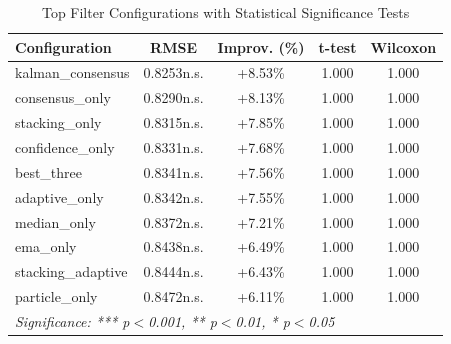 \begin{table}[htbp]
\centering
\caption{Top Filter Configurations with Statistical Significance Tests}
\label{tab:statistical-significance}
\begin{tabular}{l|c|c|c|c}
\hline
\textbf{Configuration} & \textbf{RMSE} & \textbf{Improv. (\%)} & \textbf{t-test} & \textbf{Wilcoxon} \\
\hline
kalman\_consensus & 0.8253n.s. & +8.53\% & 1.000 & 1.000 \\
consensus\_only & 0.8290n.s. & +8.13\% & 1.000 & 1.000 \\
stacking\_only & 0.8315n.s. & +7.85\% & 1.000 & 1.000 \\
confidence\_only & 0.8331n.s. & +7.68\% & 1.000 & 1.000 \\
best\_three & 0.8341n.s. & +7.56\% & 1.000 & 1.000 \\
adaptive\_only & 0.8342n.s. & +7.55\% & 1.000 & 1.000 \\
median\_only & 0.8372n.s. & +7.21\% & 1.000 & 1.000 \\
ema\_only & 0.8438n.s. & +6.49\% & 1.000 & 1.000 \\
stacking\_adaptive & 0.8444n.s. & +6.43\% & 1.000 & 1.000 \\
particle\_only & 0.8472n.s. & +6.11\% & 1.000 & 1.000 \\
\hline
\multicolumn{5}{l}{\textit{Significance: *** p$<$0.001, ** p$<$0.01, * p$<$0.05}} \\
\hline
\end{tabular}
\end{table}